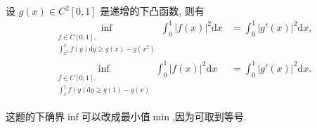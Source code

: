 \documentclass[../../main.tex]{subfiles}%
\begin{document}
\begin{proposition}\label{proposition:下凸函数积分不等式习题加强}
设 $g(x) \in C^2[0,1]$ 是递增的下凸函数, 则有
\begin{align}
\inf_{\substack{f \in C[0,1], \\ \int_{x^2}^x f(y) \mathrm{d}y \geqslant g(x) - g(x^2)}} \int_0^1 |f(x)|^2 \mathrm{d}x &= \int_0^1 |g'(x)|^2 \mathrm{d}x, \label{17.17eq1} \\
\inf_{\substack{f \in C[0,1], \\ \int_x^1 f(y) \mathrm{d}y \geqslant g(1) - g(x)}} \int_0^1 |f(x)|^2 \mathrm{d}x &= \int_0^1 |g'(x)|^2 \mathrm{d}x. \label{17.17eq2}
\end{align}
\end{proposition}
\begin{note}
这题的下确界$\inf$可以改成最小值$\min$,因为可取到等号.
\end{note}
\end{document}
